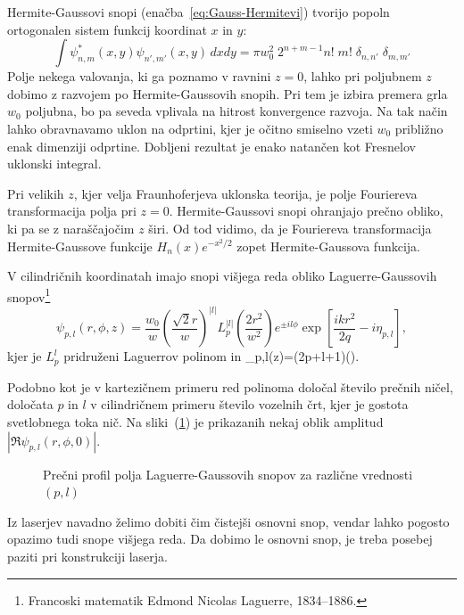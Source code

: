 Hermite-Gaussovi snopi (enačba~\ref{eq:Gauss-Hermitevi}) tvorijo popoln
ortogonalen sistem funkcij koordinat $x$ in $y$:
\begin{equation}
\int\psi_{n,m}^{*}(x,y)\psi_{n',m'}(x,y)\, dx dy=\pi w_{0}^{2}\; 
2^{n+m-1}n!\;m!\; \delta_{n,n'}\;\delta_{m,m'}
\end{equation}
Polje nekega valovanja, ki ga poznamo v ravnini $z=0$, lahko pri
poljubnem $z$ dobimo z razvojem po Hermite-Gaussovih snopih. Pri tem
je izbira premera grla $w_{0}$ poljubna, bo pa seveda vplivala na
hitrost konvergence razvoja. Na tak način lahko obravnavamo uklon
na odprtini, kjer je očitno smiselno vzeti $w_{0}$ približno enak
dimenziji odprtine. Dobljeni rezultat je enako natančen kot Fresnelov
uklonski integral.

Pri velikih $z$, kjer velja Fraunhoferjeva uklonska teorija, je
polje Fouriereva transformacija polja pri $z=0$. Hermite-Gaussovi
snopi ohranjajo prečno obliko, ki pa se z naraščajočim $z$ širi. 
Od tod vidimo, da je Fouriereva transformacija Hermite-Gaussove funkcije 
$H_{n}(x)e^{-x^{2}/2}$ zopet Hermite-Gaussova funkcija.

V cilindričnih koordinatah imajo snopi višjega reda obliko Laguerre-Gaussovih 
snopov\footnote{Francoski matematik Edmond Nicolas Laguerre, 1834--1886.}
\begin{equation}
\psi_{p,l}(r,\phi,z)=\frac{w_{0}}{w}\left(\frac{\sqrt{2}r}{w}\right)^{|l|}
L_{p}^{|l|}\left(\frac{2r^{2}}{w^{2}}\right)e^{\pm il\phi}\exp\left[\frac{ikr^{2}}{2q}-i\eta_{p,l}\right],
\label{eq:Gauss-Laguerrevi}
\end{equation}
kjer je $L_{p}^{l}$ pridruženi Laguerrov polinom in 
\beq
\eta_{p,l}\left(z\right)=(2p+l+1)\arctan\left(\right).
\label{eq:etaGL}
\eeq

Podobno kot je v kartezičnem primeru red polinoma določal število prečnih ničel,
določata $p$ in $l$ v cilindričnem primeru število vozelnih črt, kjer je gostota 
svetlobnega toka nič. Na sliki~(\ref{fig:Laguerrovi_presek})
je prikazanih nekaj oblik amplitud $|\Re\psi_{p,l}(r,\phi,0)|$.

\begin{figure}[h]
\centering
\def\svgwidth{110truemm} 

\caption{Prečni profil polja Laguerre-Gaussovih snopov za različne vrednosti $(p,l)$}
\label{fig:Laguerrovi_presek}
\end{figure}

Iz laserjev navadno želimo dobiti čim čistejši osnovni snop, vendar
lahko pogosto opazimo tudi snope višjega reda. Da dobimo le osnovni
snop, je treba posebej paziti pri konstrukciji laserja.

